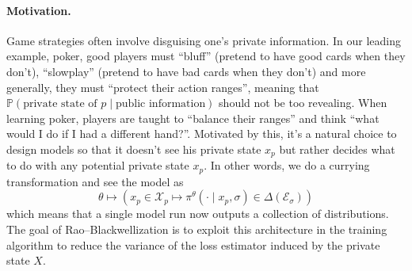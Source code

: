 \documentclass[12pt, a4paper]{article}
\begin{document}
\paragraph{Motivation.}
Game strategies often involve disguising one's private information.
In our leading example, poker, good players must ``bluff'' (pretend to have good cards when they don't), ``slowplay'' (pretend to have bad cards when they don't) and more generally, they must ``protect their action ranges'', meaning that $\mathbb{P}(\text{private state of } p\mid \text{public information})$ should not be too revealing.
When learning poker, players are taught to ``balance their ranges'' and think ``what would I do if I had a different hand?''.
Motivated by this, it's a natural choice to design models so that it doesn't see his private state $x_p$ but rather decides what to do with any potential private state $x_p$.
In other words, we do a currying transformation and see the model as
\begin{equation}\label{eq:rao-blackwell-curried-policy}
  \theta \longmapsto \left(x_p \in \mathcal{X}_p \mapsto \pi^\theta(\cdot \mid x_p, \sigma) \in \Delta(\mathcal{E}_\sigma)\right)
\end{equation}
which means that a single model run now outputs a collection of distributions.
The goal of Rao--Blackwellization is to exploit this architecture in the training algorithm to reduce the variance of the loss estimator induced by the private state $X$.

\begin{algorithm}[H]
\caption{$\mathfrak{T}^{\mathsf{pre-c}}\gets$~\texttt{SamplePreTerminal}$(\pi,N)$}
\label{alg:sample-preterminal}
\DontPrintSemicolon
{}
\end{algorithm}
\end{document}
